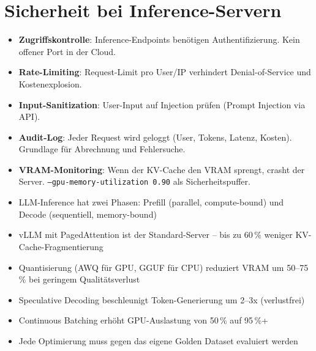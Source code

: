 \section{Sicherheit bei Inference-Servern}

\begin{itemize}[leftmargin=*]
    \item \textbf{Zugriffskontrolle}: Inference-Endpoints benötigen Authentifizierung. Kein offener Port in der Cloud.
    \item \textbf{Rate-Limiting}: Request-Limit pro User/IP verhindert Denial-of-Service und Kostenexplosion.
    \item \textbf{Input-Sanitization}: User-Input auf Injection prüfen (Prompt Injection via API).
    \item \textbf{Audit-Log}: Jeder Request wird geloggt (User, Tokens, Latenz, Kosten). Grundlage für Abrechnung und Fehlersuche.
    \item \textbf{VRAM-Monitoring}: Wenn der KV-Cache den VRAM sprengt, crasht der Server. \texttt{--gpu-memory-utilization 0.90} als Sicherheitspuffer.
\end{itemize}


\begin{zusammenfassungEnv}
\begin{itemize}[leftmargin=*]
    \item LLM-Inference hat zwei Phasen: Prefill (parallel, compute-bound) und Decode (sequentiell, memory-bound)
    \item vLLM mit PagedAttention ist der Standard-Server -- bis zu 60\,\% weniger KV-Cache-Fragmentierung
    \item Quantisierung (AWQ für GPU, GGUF für CPU) reduziert VRAM um 50--75\,\% bei geringem Qualitätsverlust
    \item Speculative Decoding beschleunigt Token-Generierung um 2--3x (verlustfrei)
    \item Continuous Batching erhöht GPU-Auslastung von 50\,\% auf 95\,\%+
    \item Jede Optimierung muss gegen das eigene Golden Dataset evaluiert werden
\end{itemize}
\end{zusammenfassungEnv}




